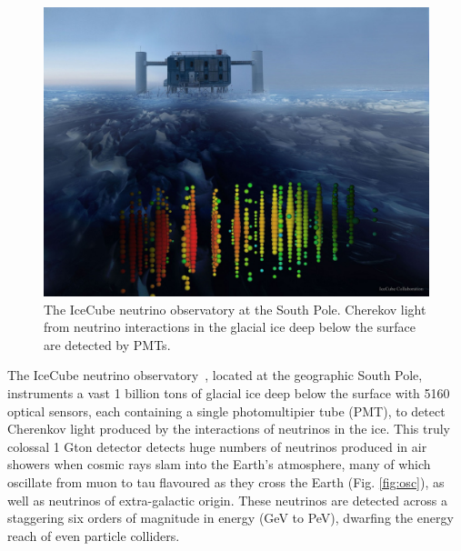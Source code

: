 \documentclass[a4paper,11pt]{article}
\begin{document}

\begin{figure} %
    \centering
	\includegraphics[width=1.\linewidth]{images/IceCube_1200x.jpg}
	\caption{The IceCube neutrino observatory at the South Pole. Cherekov light from neutrino interactions in the glacial ice deep below the surface are detected by PMTs.}
	\label{fig:atmo_osc}
\end{figure}

The IceCube neutrino observatory~\cite{Aartsen_2017}, located at the geographic South Pole, instruments a vast 1 billion tons of glacial ice deep below the surface with 5160 optical sensors, each containing a single photomultipier tube (PMT), to detect Cherenkov light produced by the interactions of neutrinos in the ice. This truly colossal 1 Gton detector detects huge numbers of neutrinos produced in air showers when cosmic rays slam into the Earth's atmosphere, many of which oscillate from muon to tau flavoured as they cross the Earth (Fig. \ref{fig:osc}), as well as neutrinos of extra-galactic origin. These neutrinos are detected across a staggering six orders of magnitude in energy (GeV to PeV), dwarfing the energy reach of even particle colliders. 

\end{document}
